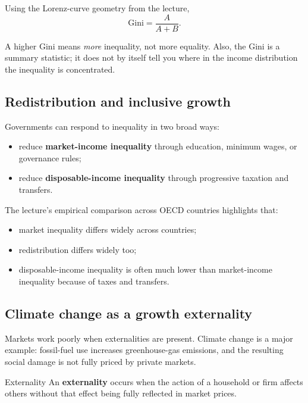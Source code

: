 \documentclass[12pt]{article}
\begin{document}
Using the Lorenz-curve geometry from the lecture,
\[
\text{Gini}=\frac{A}{A+B}.
\]

\begin{commonmistake}
A higher Gini means \emph{more} inequality, not more equality. Also, the Gini is a summary statistic; it does not by itself tell you where in the income distribution the inequality is concentrated.
\end{commonmistake}

\subsection{Redistribution and inclusive growth}

Governments can respond to inequality in two broad ways:
\begin{itemize}[leftmargin=1.5em]
\item reduce \textbf{market-income inequality} through education, minimum wages, or governance rules;
\item reduce \textbf{disposable-income inequality} through progressive taxation and transfers.
\end{itemize}

The lecture's empirical comparison across OECD countries highlights that:
\begin{itemize}[leftmargin=1.5em]
\item market inequality differs widely across countries;
\item redistribution differs widely too;
\item disposable-income inequality is often much lower than market-income inequality because of taxes and transfers.
\end{itemize}

\subsection{Climate change as a growth externality}

Markets work poorly when externalities are present. Climate change is a major example: fossil-fuel use increases greenhouse-gas emissions, and the resulting social damage is not fully priced by private markets.

\begin{definition}{Externality}{}
An \textbf{externality} occurs when the action of a household or firm affects others without that effect being fully reflected in market prices.
\end{definition}
\end{document}
